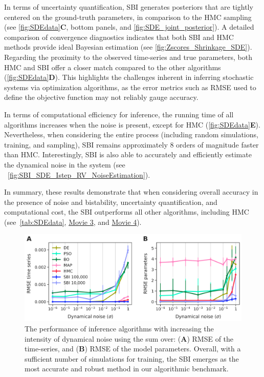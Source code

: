 \documentclass[preprint,11pt,authoryear]{elsarticle}
\begin{document}
In terms of uncertainty quantification, SBI generates posteriors that are tightly centered on the ground-truth parameters, in comparison to the HMC sampling (see \autoref{fig:SDEdata}\textbf{C}, bottom panels, and \autoref{fig:SDE_joint_posterior}). A detailed comparison of convergence diagnostics indicates that both SBI and HMC methods provide ideal Bayesian estimation (see \autoref{fig:Zscores_Shrinkage_SDE}).
Regarding the proximity to the observed time-series and true parameters, both HMC and SBI offer a closer match compared to the other algorithms (\autoref{fig:SDEdata}\textbf{D}). This highlights the challenges inherent in inferring stochastic systems via optimization algorithms, as the error metrics such as RMSE used to define the objective function may not reliably gauge accuracy. 

In terms of computational efficiency for inference, the running time of all algorithms increases when the noise is present, except for HMC (\autoref{fig:SDEdata}\textbf{E}). Nevertheless, when considering the entire process (including random simulations, training, and sampling), SBI remains approximately 8 orders of magnitude faster than HMC. Interestingly, SBI is also able to accurately and efficiently estimate the dynamical noise in the system (see ~\autoref{fig:SBI_SDE_Istep_RV_NoiseEstimation}). 

In summary, these results demonstrate that when considering overall accuracy in the presence of noise and bistability, uncertainty quantification, and computational cost, the SBI outperforms all other algorithms, including HMC (see~\autoref{tab:SDEdata},  \href{run:https://github.com/ins-amu/Inference_MFM/blob/main/Videos/Movie3_MPR_SDE_HMC_RV.mp4}{Movie 3}, and  \href{run:https://github.com/ins-amu/Inference_MFM/blob/main/Videos/Movie4_MPR_SDE_SBI_RV.mp4}{Movie 4}). 


\begin{figure}[ht]
    \centering
    \includegraphics[width=\linewidth]{Figs/Fig3.png}
    \caption{The performance of inference algorithms with increasing the intensity of dynamical noise using the sum over: (\textbf{A}) RMSE of the time-series, and (\textbf{B}) RMSE of the model parameters. Overall, with a sufficient number of simulations for training, the SBI emerges as the most accurate and robust method in our algorithmic benchmark.
    }
    \label{fig:NoiseSweep}
\end{figure}
\end{document}
